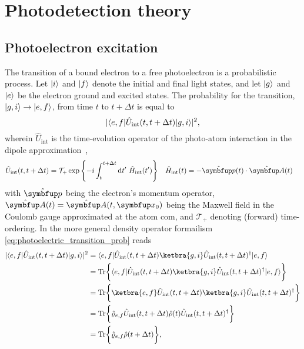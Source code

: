 \chapter{Photodetection theory}\label{app:photodetection_theory}

\section{Photoelectron excitation}

The transition of a bound electron to a free photoelectron is a probabilistic process.
Let $\lvert i\rangle$ and $\lvert f\rangle$ denote the initial and final light states, and let $\lvert g\rangle$ and $\lvert e\rangle$ be the electron ground and excited states.
The probability for the transition, $\lvert g,i\rangle\to\lvert e,f\rangle$, from time $t$ to $t+\Delta t$ is equal to
\begin{equation}
	\lvert
		\langle e,f\rvert
		\hat{U}_\text{int}(t,t+\Delta t)
		\lvert g,i\rangle
	\rvert^2
	\label{eq:photoelectric_transition_prob}
	,
\end{equation}
wherein $\hat{U}_\text{int}$ is the time-evolution operator of the photo-atom interaction in the dipole approximation~\cite[p.~689]{Mandel1995},
\begin{align}
	\hat{U}_\text{int}(t,t+\Delta t)
	&=
	\mathcal{T}_+
	\exp\left\{
		-i
		\int_t^{t+\Delta t}
		\dd{t^\prime}
		\hat{H}_\text{int}(t^\prime)
	\right\}
	&
	\hat{H}_\text{int}(t)
	&=
	-
	\hat{\vb{p}}(t)
	\vdot
	\hat{\vb{A}}(t)
	\label{eq:photoelectric_time_evolution_operator}
\end{align}
with $\vu{p}$ being the electron's momentum operator, $\vu{A}(t)=\vu{A}(t,\vb{x}_0)$ being the Maxwell field in the Coulomb gauge approximated at the atom \gls{com}, and $\mathcal{T}_+$ denoting (forward) time-ordering.
In the more general density operator formailism \cref{eq:photoelectric_transition_prob} reads~\cite[p.~686]{Mandel1995}
\begin{equation}
	\begin{split}
		\abs{
			\bra{e,f}
			\hat{U}_\text{int}(t,t+\Delta t)
			\ket{g,i}
		}^2
		&=
		\bra{e,f}
		\hat{U}_\text{int}(t,t+\Delta t)
		\ketbra{g,i}
		\hat{U}_\text{int}(t,t+\Delta t)^\dagger
		\ket{e,f}
		\\
		&=
		\trace\biggl\{
			\bra{e,f}
			\hat{U}_\text{int}(t,t+\Delta t)
			\ketbra{g,i}
			\hat{U}_\text{int}(t,t+\Delta t)^\dagger
			\ket{e,f}
		\biggr\}
		\\
		&=
		\trace\biggl\{
			\ketbra{e,f}
			\hat{U}_\text{int}(t,t+\Delta t)
			\ketbra{g,i}
			\hat{U}_\text{int}(t,t+\Delta t)^\dagger
		\biggr\}
		\\
		&=
		\trace\biggl\{
			\hat\varrho_{e,f}
			\hat{U}_\text{int}(t,t+\Delta t)
			\hat\rho(t)
			\hat{U}_\text{int}(t,t+\Delta t)^\dagger
		\biggr\}
		\\
		&=
		\trace\biggl\{
			\hat\varrho_{e,f}
			\hat\rho(t+\Delta t)
		\biggr\}
		,
	\end{split}
	\label{eq:photoelectric_transition_prob_density}
\end{equation}

